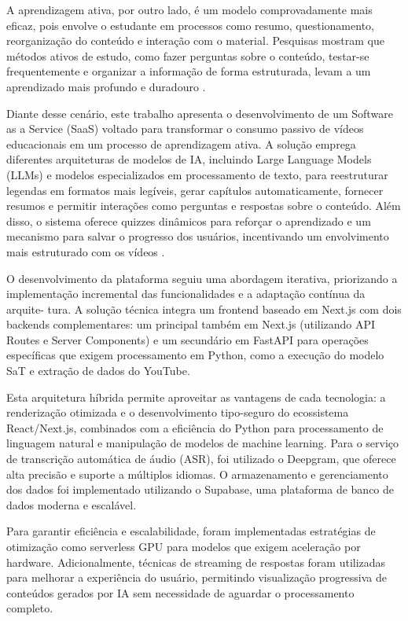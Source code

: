 \documentclass[tcc,capa]{texufpel}
\begin{document}
A aprendizagem ativa, por outro lado, é um modelo comprovadamente mais eficaz, pois envolve o estudante em processos como resumo, questionamento, reorganização do conteúdo e interação com o material. Pesquisas mostram que métodos ativos de estudo, como fazer perguntas sobre o conteúdo, testar-se frequentemente e organizar a informação de forma estruturada, levam a um aprendizado mais profundo e duradouro \cite{freeman2014active}. 

Diante desse cenário, este trabalho apresenta o desenvolvimento de um Software as a Service (SaaS) voltado para transformar o consumo passivo de vídeos educacionais em um processo de aprendizagem ativa. A solução emprega diferentes arquiteturas de modelos de IA, incluindo Large Language Models (LLMs) e modelos especializados em processamento de texto, para reestruturar legendas em formatos mais legíveis, gerar capítulos automaticamente, fornecer resumos e permitir interações como perguntas e respostas sobre o conteúdo. Além disso, o sistema oferece quizzes dinâmicos para reforçar o aprendizado e um mecanismo para salvar o progresso dos usuários, incentivando um envolvimento mais estruturado com os vídeos \cite{schwan2004learning}.

O desenvolvimento da plataforma seguiu uma abordagem iterativa, priorizando a
implementação incremental das funcionalidades e a adaptação contínua da arquite-
tura. A solução técnica integra um frontend baseado em Next.js com dois backends
complementares: um principal também em Next.js (utilizando API Routes e Server
Components) e um secundário em FastAPI para operações específicas que exigem
processamento em Python, como a execução do modelo SaT \cite{frohmann2024segment} e extração de dados do
YouTube.

Esta arquitetura híbrida permite aproveitar as vantagens de cada tecnologia: a
renderização otimizada e o desenvolvimento tipo-seguro do ecossistema React/Next.js,
combinados com a eficiência do Python para processamento de linguagem natural
e manipulação de modelos de machine learning. Para o serviço de transcrição automática
de áudio (ASR), foi utilizado o Deepgram, que oferece alta precisão e suporte a múltiplos
idiomas. O armazenamento e gerenciamento dos dados foi implementado utilizando o
Supabase, uma plataforma de banco de dados moderna e escalável. 

Para garantir eficiência e escalabilidade, foram implementadas estratégias de
otimização como serverless GPU para modelos que exigem aceleração por hardware.
Adicionalmente, técnicas de streaming de respostas foram utilizadas para melhorar
a experiência do usuário, permitindo visualização progressiva de conteúdos gerados
por IA sem necessidade de aguardar o processamento completo.
\end{document}
